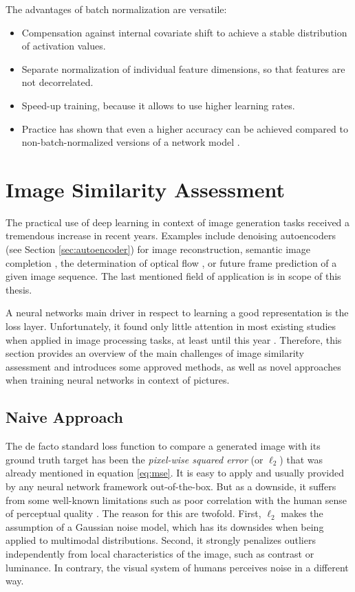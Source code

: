 The advantages of batch normalization are versatile:

\begin{itemize}
\item Compensation against internal covariate shift to achieve a stable distribution of activation values.
\item Separate normalization of individual feature dimensions, so that features are not decorrelated.
\item Speed-up training, because it allows to use higher learning rates.
\item Practice has shown that even a higher accuracy can be achieved compared to non-batch-normalized versions of a network model \parencite[p. 7]{batchnorm}.
\end{itemize}


\section{Image Similarity Assessment}

The practical use of deep learning in context of image generation tasks received a tremendous increase in recent years. Examples include denoising autoencoders (see Section \ref{sec:autoencoder}) for image reconstruction, semantic image completion \parencite{sem-img-inpainting}, the determination of optical flow \parencite{flownet}, \parencite{flow-static-img} or future  frame prediction of a given image sequence. The last mentioned field of application is in scope of this thesis. 

A neural networks main driver in respect to learning a good representation is the loss layer. Unfortunately, it found only little attention in most existing studies when applied in image processing tasks, at least until this year \parencite{loss-func-img-proc}. Therefore, this section provides an overview of the main challenges of image similarity assessment and introduces some approved methods, as well as novel approaches when training neural networks in context of pictures.


\subsection{Naive Approach} \label{sec:img-sim-naive}

The de facto standard loss function to compare a generated image with its ground truth target has been the \textit{pixel-wise squared error} (or $ \ell_{2} $) that was already mentioned in equation \ref{eq:mse}. It is easy to apply and usually provided by any neural network framework out-of-the-box. But as a downside, it suffers from some well-known limitations such as poor correlation with the human sense of perceptual quality \parencite{loss-func-img-proc}. The reason for this are twofold. First, $ \ell_{2} $ makes the assumption of a Gaussian noise model, which has its downsides when being applied to multimodal distributions. Second, it strongly penalizes outliers independently from local characteristics of the image, such as contrast or luminance. In contrary, the visual system of humans perceives noise in a different way.

